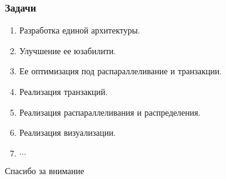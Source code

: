 \documentclass[14pt]{beamer}
\begin{document}
\begin{frame}
    \frametitle{Задачи}
    \begin{enumerate}
        \item<1> Разработка единой архитектуры.
        \item<1> Улучшение ее юзабилити.
        \item<1> Ее оптимизация под распараллеливание и транзакции.
        \item<1-2> Реализация транзакций.
        \item<1> Реализация распараллеливания и распределения.
        \item<1> Реализация визуализации.
        \item<1>  $\cdots$
    \end{enumerate}
\end{frame}

\begin{frame}
    \begin{center}
        Спасибо за внимание
    \end{center}
\end{frame}
\end{document}
